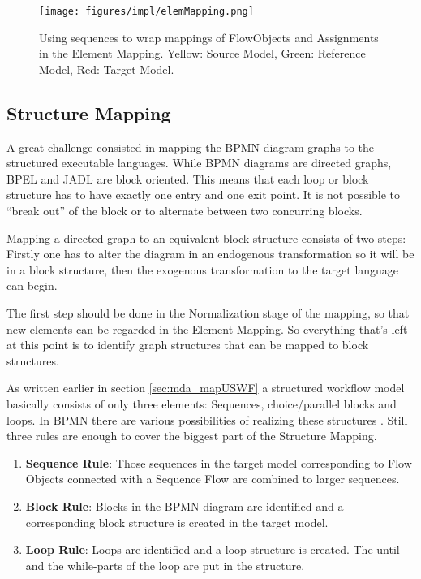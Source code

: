 \begin{figure}[ht]
	\centering
	\texttt{[image: figures/impl/elemMapping.png]}
	\caption[Use of Sequences in Element Mapping]{Using sequences to wrap mappings of FlowObjects and Assignments in the Element Mapping. Yellow: Source Model, Green: Reference Model, Red: Target Model.}
	\label{fig:elemMapping}
\end{figure}


\subsection{Structure Mapping}

A great challenge consisted in mapping the BPMN diagram graphs to the structured executable languages. While BPMN diagrams are directed graphs, BPEL and JADL are block oriented. This means that each loop or block structure has to have exactly one entry and one exit point. It is not possible to ``break out'' of the block or to alternate between two concurring blocks.

Mapping a directed graph to an equivalent block structure consists of two steps: Firstly one has to alter the diagram in an endogenous transformation so it will be in a block structure, then the exogenous transformation to the target language can begin.

The first step should be done in the Normalization stage of the mapping, so that new elements can be regarded in the Element Mapping. So everything that's left at this point is to identify graph structures that can be mapped to block structures.

As written earlier in section \ref{sec:mda_mapUSWF} a structured workflow model basically consists of only three elements: Sequences, choice/parallel blocks and loops. In BPMN there are various possibilities of realizing these structures \cite{patterns1,patterns2}. Still three rules are enough to cover the biggest part of the Structure Mapping.

\begin{enumerate}
	\item \textbf{Sequence Rule}: Those sequences in the target model corresponding to Flow Objects connected with a Sequence Flow are combined to larger sequences.
	\item \textbf{Block Rule}: Blocks in the BPMN diagram are identified and a corresponding block structure is created in the target model.
	\item \textbf{Loop Rule}: Loops are identified and a loop structure is created. The until- and the while-parts of the loop are put in the structure.
\end{enumerate}

